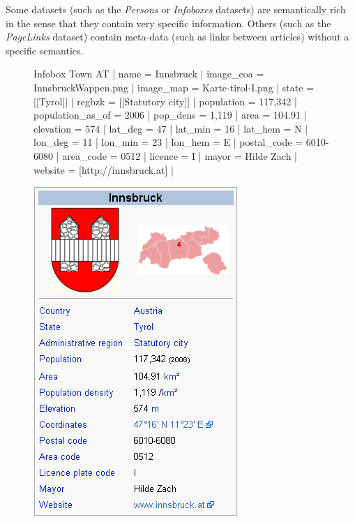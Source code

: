 \documentclass{llncs}
\begin{document}
Some datasets (such as the \textit{Persons} or \textit{Infoboxes} datasets) are semantically rich in the sense that they contain very specific information. Others (such as the \textit{PageLinks} dataset) contain meta-data (such as links between articles) without a specific semantics.

\begin{figure}[tbp]
\begin{minipage}[b]{.53\linewidth} 
\fontsize{9pt}{0}
\begin{listing}{1}
{{Infobox Town AT |
  name = Innsbruck |
  image_coa =  InnsbruckWappen.png |
  image_map = Karte-tirol-I.png |
  state = [[Tyrol]] |
  regbzk = [[Statutory city]] |
  population = 117,342 |
  population_as_of = 2006 |
  pop_dens = 1,119 |
  area = 104.91 |
  elevation = 574 |
  lat_deg = 47 |
  lat_min = 16 |
  lat_hem = N |
  lon_deg = 11 |
  lon_min = 23 |
  lon_hem = E |
  postal_code = 6010-6080 |
  area_code = 0512 |
  licence = I |
  mayor = Hilde Zach |
  website = [http://innsbruck.at] |
}}
\end{listing}
\vspace{2pt}
\end{minipage}
\hspace{.03\linewidth}
\begin{minipage}[b]{.42\linewidth}
\centering
\includegraphics[width=\textwidth]{innsbruck}

\end{minipage}
\end{figure}
\end{document}
